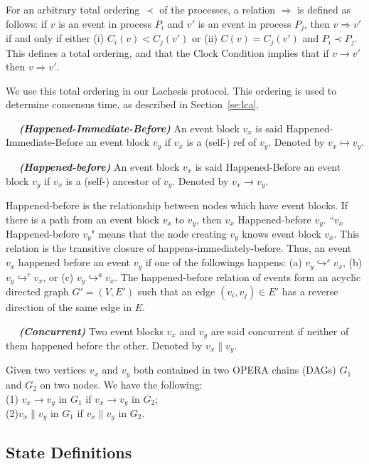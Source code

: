 \documentclass{article}
\newcommand{\dfnn}[2]{$\quad$ \textbf{\emph{(#1)}} {#2}}
\newcommand{\eself}{\hookrightarrow^{s}}
\newcommand{\eref}{\hookrightarrow^{r}}
\newcommand{\eancestor}{\hookrightarrow^{a}}
\newcommand{\hibefore}{\mapsto}
\newcommand{\hbefore}{\rightarrow}
\newcommand{\concur}{\parallel}
\begin{document}
For an arbitrary total ordering $\prec$ of the processes, a relation $\Rightarrow$ is defined as follows: if $v$ is an event in process $P_i$ and $v'$ is an event in process $P_j$, then $v \Rightarrow v'$ if and only if either (i) $C_i(v) < C_j(v')$ or (ii) $C(v)= C_j(v')$ and $P_i \prec P_j$. This defines a total ordering, and that the Clock Condition implies that if $v \rightarrow v'$ then $v \Rightarrow v'$. 

We use this total ordering in our Lachesis protocol. This ordering is used to determine consensus time, as described in Section~\ref{se:lca}.

\dfnn{Happened-Immediate-Before}{An event block $v_x$ is said Happened-Immediate-Before an event block $v_y$ if $v_x$ is a (self-) ref of $v_y$. Denoted by $v_x \hibefore v_y$.}

\dfnn{Happened-before}{An event block $v_x$ is said Happened-Before an event block $v_y$ if $v_x$ is a (self-) ancestor of $v_y$. Denoted by $v_x \hbefore v_y$.}

Happened-before is the relationship between nodes which have event blocks. If there is a path from an event block $v_x$ to $v_y$, then $v_x$ Happened-before $v_y$. ``$v_x$ Happened-before $v_y$" means that the node creating $v_y$ knows event block $v_x$. This relation is the transitive closure of happens-immediately-before. Thus, an event $v_x$ happened before an event $v_y$ if one of the followings happens: (a) $v_y \eself v_x$, (b) $v_y \eref v_x$,  or (c) $v_y \eancestor v_x$. The happened-before relation of events form an acyclic directed graph $G' = (V, E')$ such that an edge $(v_i,v_j) \in E'$ has a reverse direction of the same edge in $E$.

\dfnn{Concurrent}{Two event blocks $v_x$ and $v_y$ are said concurrent if neither of them  happened before the other. Denoted by $v_x \concur v_y$.}

Given two vertices $v_x$ and $v_y$ both contained in two OPERA chains (DAGs) $G_1$ and $G_2$ on two nodes. We have the following: \\

(1) $v_x \hbefore v_y$ in $G_1$ if $v_x \hbefore v_y$ in $G_2$;\\ 
(2)$v_x \concur v_y$ in $G_1$ if $v_x \concur v_y$ in $G_2$.

\subsection{State Definitions}
\end{document}
